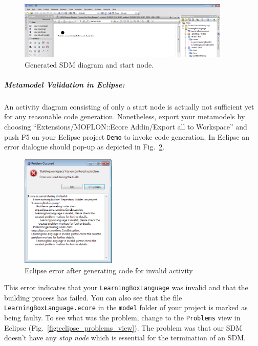\begin{figure}[htp]
\begin{center}
  \includegraphics[width=0.9\textwidth]{pics/sdmBilder/removeCard/sdm02RAW}
  \caption{Generated SDM diagram and start node.}  
  \label{fig:sdm_skeleton}
\end{center}
\end{figure}

\subparagraph{Metamodel Validation in Eclipse:}
\label{par:validation_in_eclipse}
An activity diagram consisting of only a start node is actually not sufficient yet for any reasonable code generation. 
Nonetheless, export your metamodels by choosing ``Extensions/\-MOFLON::Ecore Addin/\-Export all to Workspace'' and push F5 on your Eclipse project \texttt{Demo} to invoke code generation. 
In Eclipse an error dialogue should pop-up as depicted in Fig.~\ref{fig:eclipse_error}.

\begin{figure}[htp]
\begin{center}
  \includegraphics[width=0.4\textwidth]{pics/sdmBilder/removeCard/sdm15RAW}
  \caption{Eclipse error after generating code for invalid activity}  
  \label{fig:eclipse_error}
\end{center}
\end{figure}

This error indicates that your \texttt{Learning\-Box\-Language} was invalid and that the building process has failed. You can also see that the file \texttt{Learning\-Box\-Language.\-ecore} in the \texttt{model} folder of your project is marked as being faulty.
To see what was the problem, change to the \texttt{Problems} view in Eclipse (Fig.~\ref{fig:eclipse_problems_view}). 
The problem was that our SDM doesn't have any \emph{stop node} which is essential for the termination of an SDM.

